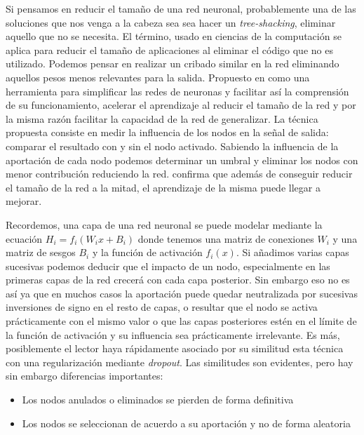 Si pensamos en reducir el tamaño de una red neuronal, probablemente una de las soluciones que nos venga a la cabeza sea sea hacer un \textit{tree-shacking}, eliminar aquello que no se necesita. El término, usado en ciencias de la computación se aplica para reducir el tamaño de aplicaciones al eliminar el código que no es utilizado. Podemos pensar en realizar un cribado similar en la red eliminando aquellos pesos menos relevantes para la salida. Propuesto en  como una herramienta para simplificar las redes de neuronas y facilitar así la comprensión de su funcionamiento, acelerar el aprendizaje al reducir el tamaño de la red y por la misma razón facilitar la capacidad de la red de generalizar. La técnica propuesta consiste en medir la influencia de los nodos en la señal de salida: comparar el resultado con y sin el nodo activado. Sabiendo la influencia de la aportación de cada nodo podemos determinar un umbral y eliminar los nodos con menor contribución reduciendo la red.  confirma que además de conseguir reducir el tamaño de la red a la mitad, el aprendizaje de la misma puede llegar a mejorar.


Recordemos, una capa de una red neuronal se puede modelar mediante la ecuación $H_i = f_i(W_ix+B_i)$ donde tenemos una matriz de conexiones $W_{i}$ y una matriz de sesgos $B_{i}$ y la función de activación $f_i(x)$. Si añadimos varias capas sucesivas podemos deducir que el impacto de un nodo, especialmente en las primeras capas de la red crecerá con cada capa posterior. Sin embargo eso no es así ya que en muchos casos la aportación puede quedar neutralizada por sucesivas inversiones de signo en el resto de capas, o resultar que el nodo se activa prácticamente con el mismo valor o que las capas posteriores estén en el límite de la función de activación y su influencia sea prácticamente irrelevante\cite{Mozer1989}. Es más, posiblemente el lector haya rápidamente asociado por su similitud esta técnica con una regularización mediante \textit{dropout}. Las similitudes son evidentes, pero hay sin embargo diferencias importantes:
\begin{itemize}
  \item Los nodos anulados o eliminados se pierden de forma definitiva
  \item Los nodos se seleccionan de acuerdo a su aportación y no de forma aleatoria
\end{itemize}

